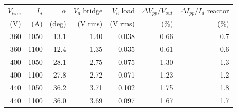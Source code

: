 \begin{tabular}{rrrrrrr}
\toprule
$V_{line}$ & $I_d$ & $\alpha$ & $V_6$ bridge & $V_6$ load & $\Delta V_{pp}/V_{out}$ & $\Delta I_{pp}/I_d$ reactor\\
(V) & (A) & (deg) & (V rms) & (V rms) & (\%) & (\%)\\
\midrule
360 & 1050 & 13.1 & 1.40 & 0.038 & 0.66 & 0.7\\
360 & 1100 & 12.4 & 1.35 & 0.035 & 0.61 & 0.6\\
400 & 1050 & 28.1 & 2.75 & 0.075 & 1.30 & 1.3\\
400 & 1100 & 27.8 & 2.72 & 0.071 & 1.23 & 1.2\\
440 & 1050 & 36.2 & 3.71 & 0.102 & 1.75 & 1.8\\
440 & 1100 & 36.0 & 3.69 & 0.097 & 1.67 & 1.7\\
\bottomrule
\end{tabular}
